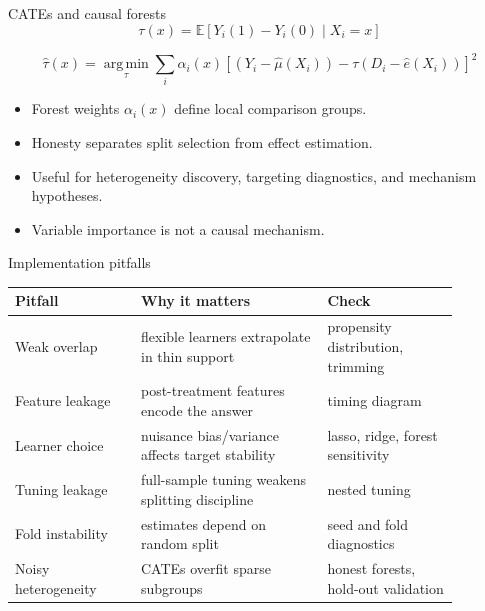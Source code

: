 \documentclass[aspectratio=169,11pt]{beamer}
\newcommand{\E}{\mathbb{E}}
\newcommand{\1}{\mathbf{1}}
\newcommand{\argmin}{\operatorname*{arg\,min}}
\begin{document}
\begin{frame}{CATEs and causal forests}
\small
\[
\tau(x)=\E[Y_i(1)-Y_i(0)\mid X_i=x]
\]

\[
\widehat\tau(x)=
\argmin_{\tau}
\sum_i \alpha_i(x)
\left[
\left(Y_i-\widehat\mu(X_i)\right)
-
\tau\left(D_i-\widehat e(X_i)\right)
\right]^2
\]

\begin{itemize}
    \item Forest weights \(\alpha_i(x)\) define local comparison groups.
    \item Honesty separates split selection from effect estimation.
    \item Useful for heterogeneity discovery, targeting diagnostics, and mechanism hypotheses.
    \item Variable importance is not a causal mechanism.
\end{itemize}
\end{frame}

\begin{frame}{Implementation pitfalls}
\small
\begin{tabular}{p{0.25\linewidth} p{0.37\linewidth} p{0.26\linewidth}}
\toprule
Pitfall & Why it matters & Check \\
\midrule
Weak overlap & flexible learners extrapolate in thin support & propensity distribution, trimming \\
Feature leakage & post-treatment features encode the answer & timing diagram \\
Learner choice & nuisance bias/variance affects target stability & lasso, ridge, forest sensitivity \\
Tuning leakage & full-sample tuning weakens splitting discipline & nested tuning \\
Fold instability & estimates depend on random split & seed and fold diagnostics \\
Noisy heterogeneity & CATEs overfit sparse subgroups & honest forests, hold-out validation \\
\bottomrule
\end{tabular}
\end{frame}
\end{document}

